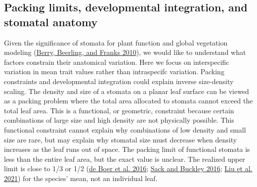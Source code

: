 \documentclass[
  12pt,
]{article}
\begin{document}
\hypertarget{packing-limits-developmental-integration-and-stomatal-anatomy}{%
\subsection{Packing limits, developmental integration, and stomatal anatomy}\label{packing-limits-developmental-integration-and-stomatal-anatomy}}

Given the significance of stomata for plant function and global vegetation modeling (\protect\hyperlink{ref-berry_stomata:_2010}{Berry, Beerling, and Franks 2010}), we would like to understand what factors constrain their anatomical variation. Here we focus on interspecific variation in mean trait values rather than intraspecifc variation. Packing constraints and developmental integration could explain inverse size-density scaling. The density and size of a stomata on a planar leaf surface can be viewed as a packing problem where the total area allocated to stomata cannot exceed the total leaf area. This is a functional, or geometric, constraint because certain combinations of large size and high density are not physically possible. This functional constraint cannot explain why combinations of low density and small size are rare, but may explain why stomatal size must decrease when density increases as the leaf runs out of space. The packing limit of functional stomata is less than the entire leaf area, but the exact value is unclear. The realized upper limit is close to 1/3 or 1/2 (\protect\hyperlink{ref-de_boer_optimal_2016}{de Boer et al. 2016}; \protect\hyperlink{ref-sack_developmental_2016}{Sack and Buckley 2016}; \protect\hyperlink{ref-liu_scaling_2021}{Liu et al. 2021}) for the species' mean, not an individual leaf.
\end{document}
